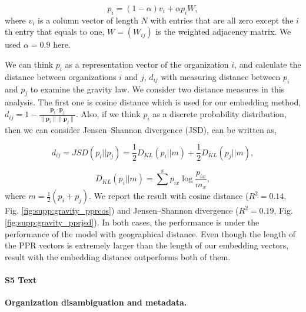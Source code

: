 \documentclass[12pt]{article} %
\begin{document}
\begin{equation}
	\label{eq:ppr}
	p_i = (1 - \alpha) v_i + \alpha p_i W,
\end{equation}
where $v_i$ is a column vector of length $N$ with entries that are all zero except the $i$th entry that equals to one, $W = (W_{ij})$ is the weighted adjacency matrix. We used $\alpha=0.9$ here.

 We can think $p_i$ as a representation vector of the organization $i$, and calculate the distance between organizations $i$ and $j$, $d_{ij}$ with measuring distance between $p_i$ and $p_j$ to examine the gravity law. We consider two distance measures in this analysis. The first one is cosine distance which is used for our embedding method, $d_{ij} = 1 - \frac{\bm{p}_{i} \cdot \bm{p}_{j}}{\lVert \bm{p}_{i} \rVert \lVert \bm{p}_{j} \rVert}$. Also, if we think $p_i$ as a discrete probability distribution, then we can consider Jensen–Shannon divergence (JSD), can be written as,

\begin{equation}
	\label{eq:JSD}
	d_{ij} = JSD(p_i||p_j) = \frac{1}{2}D_{KL}(p_i||m) + \frac{1}{2}D_{KL}(p_j||m),
\end{equation}

\begin{equation}
	\label{eq:KL}
	D_{KL}(p_i||m) = \sum^x p_{ix}\log\frac{p_{ix}}{m_x},
\end{equation}
where $m=\frac{1}{2}(p_i+p_j)$. We report the result with cosine distance ($R^2=0.14$, Fig. \ref{fig:supp:gravity_pprcos}) and  Jensen–Shannon divergence ($R^2=0.19$, Fig. \ref{fig:supp:gravity_pprjsd}). In both cases, the performance is under the performance of the model with geographical distance. Even though the length of the PPR vectors is extremely larger than the length of our embedding vectors, result with the embedding distance outperforms both of them. 



%
\paragraph*{S5 Text}
\label{si:text:organizations}
{\bf Organization disambiguation and metadata.}
\end{document}
